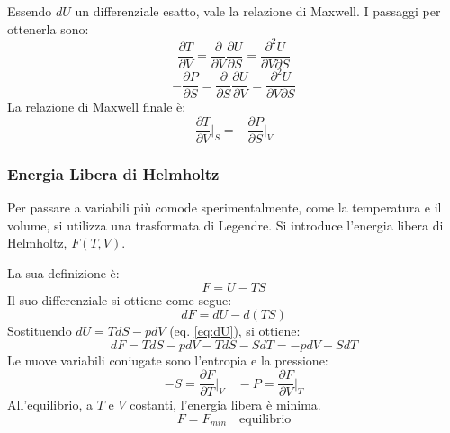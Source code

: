 Essendo $dU$ un differenziale esatto, vale la relazione di Maxwell. I passaggi per ottenerla sono:
\begin{equation}
    \frac{\partial T}{\partial V}=\frac{\partial}{\partial V}\frac{\partial U}{\partial S}=\frac{\partial^{2}U}{\partial V\partial S}
    \label{eq:maxwell1}
\end{equation}
\begin{equation}
    -\frac{\partial P}{\partial S}=\frac{\partial}{\partial S}\frac{\partial U}{\partial V}=\frac{\partial^{2}U}{\partial V\partial S}
    \label{eq:maxwell2}
\end{equation}
La relazione di Maxwell finale è:
\begin{equation}
    \frac{\partial T}{\partial V}\bigg|_{S}=-\frac{\partial P}{\partial S}\bigg|_{V}
    \label{eq:maxwell_finale_U}
\end{equation}

\subsubsection{Energia Libera di Helmholtz}

Per passare a variabili più comode sperimentalmente, come la temperatura e il volume, si utilizza una trasformata di Legendre. Si introduce l'energia libera di Helmholtz, $F(T,V)$.

La sua definizione è:
\begin{equation}
    F=U-TS
    \label{eq:def_F}
\end{equation}
Il suo differenziale si ottiene come segue:
\begin{equation}
    dF=dU-d(TS)
    \label{eq:dF_start}
\end{equation}
Sostituendo $dU = TdS - pdV$ (eq. \ref{eq:dU}), si ottiene:
\begin{equation}
    dF=TdS-pdV-TdS-SdT=-pdV-SdT
    \label{eq:dF_finale}
\end{equation}
Le nuove variabili coniugate sono l'entropia e la pressione:
\begin{equation}
    -S=\frac{\partial F}{\partial T}\bigg|_{V} \quad -P=\frac{\partial F}{\partial V}\bigg|_{T}
    \label{eq:coniugate_F}
\end{equation}
All'equilibrio, a $T$ e $V$ costanti, l'energia libera è minima.
\begin{equation}
    F=F_{min} \quad \text{equilibrio}
    \label{eq:F_min}
\end{equation}